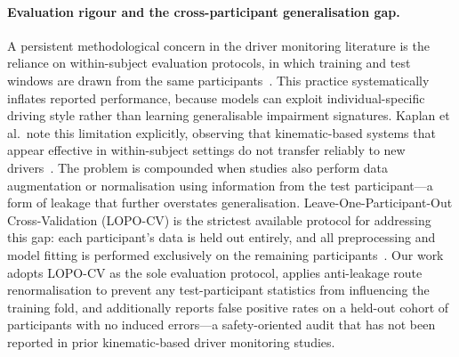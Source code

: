\paragraph{Evaluation rigour and the cross-participant generalisation gap.}
A persistent methodological concern in the driver monitoring literature is the
reliance on within-subject evaluation protocols, in which training and test windows
are drawn from the same participants~\cite{Kaplan2015}.
This practice systematically inflates reported performance, because models can
exploit individual-specific driving style rather than learning generalisable
impairment signatures.
Kaplan et al.\ note this limitation explicitly, observing that kinematic-based
systems that appear effective in within-subject settings do not transfer reliably
to new drivers~\cite{Kaplan2015}.
The problem is compounded when studies also perform data augmentation or
normalisation using information from the test participant---a form of leakage
that further overstates generalisation.
Leave-One-Participant-Out Cross-Validation (LOPO-CV) is the strictest available
protocol for addressing this gap: each participant's data is held out entirely,
and all preprocessing and model fitting is performed exclusively on the remaining
participants~\cite{Engstrom2017}.
Our work adopts LOPO-CV as the sole evaluation protocol, applies anti-leakage
route renormalisation to prevent any test-participant statistics from influencing
the training fold, and additionally reports false positive rates on a held-out
cohort of participants with no induced errors---a safety-oriented audit that has
not been reported in prior kinematic-based driver monitoring studies.
